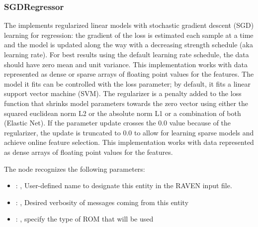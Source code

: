 \subsubsection{SGDRegressor}
  The  implements regularized linear models with stochastic
  gradient descent (SGD) learning for regression: the gradient of the loss is estimated each sample
  at                         a time and the model is updated along the way with a decreasing
  strength schedule                         (aka learning rate). For best results using the default
  learning rate schedule, the                         data should have zero mean and unit variance.
  This implementation works with data represented as dense or sparse arrays of floating
  point values for the features. The model it fits can be controlled with the loss parameter;
  by default, it fits a linear support vector machine (SVM).                         The regularizer
  is a penalty added to the loss function that shrinks model parameters towards
  the zero vector using either the squared euclidean norm L2 or the absolute norm L1 or a
  combination of both (Elastic Net). If the parameter update crosses the 0.0 value because
  of the regularizer, the update is truncated to $0.0$ to allow for learning sparse models and
  achieve online feature selection.                         This implementation works with data
  represented as dense arrays of floating point values for the features.

  The  node recognizes the following parameters:
    \begin{itemize}
      \item {}: , 
        User-defined name to designate this entity in the RAVEN input file.
      \item {}: , 
        Desired verbosity of messages coming from this entity
      \item {}: , 
        specify the type of ROM that will be used
  \end{itemize}

